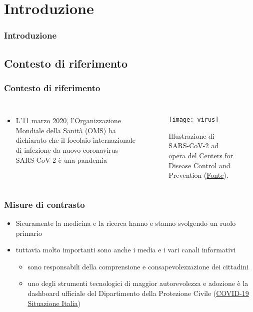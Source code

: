 \documentclass[../../main.tex]{subfiles}
\begin{document}
\section{Introduzione}

\begin{frame}
    \frametitle{Introduzione}
\end{frame}

\subsection{Contesto di riferimento}
\begin{frame}
    \frametitle{Contesto di riferimento}
    
    \begin{columns}
        
        \begin{itemize}
            \item L'11 marzo 2020, l'Organizzazione Mondiale della Sanità (OMS) ha dichiarato che il focolaio internazionale di infezione da nuovo coronavirus SARS-CoV-2 è una pandemia
        \end{itemize}

        \begin{figure}
            \texttt{[image: virus]}
            \caption{Illustrazione di SARS-CoV-2 ad opera del Centers for Disease Control and Prevention (\href{https://phil.cdc.gov/Details.aspx?pid=23312}{Fonte}).}
        \end{figure}
        
    \end{columns}

\end{frame}

\begin{frame}
    \frametitle{Misure di contrasto}

    \begin{itemize}
        \item<1-> Sicuramente la medicina e la ricerca hanno e stanno svolgendo
        un ruolo primario
        \item<2-> tuttavia molto importanti sono anche i media e i vari canali informativi
        \begin{itemize}
            \item sono responsabili della comprensione e \alert{consapevolezzazione dei cittadini}
            \item uno degli strumenti tecnologici di maggior autorevolezza e adozione è la dashboard ufficiale del Dipartimento della Protezione Civile (\href{https://opendatadpc.maps.arcgis.com/apps/opsdashboard/index.html\#/b0c68bce2cce478eaac82fe38d4138b1}{COVID-19 Situazione Italia})
        \end{itemize}              

    \end{itemize}

\end{frame}
\end{document}
